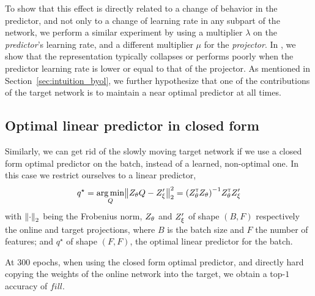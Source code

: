 
To show that this effect is directly related to a change of behavior in the predictor, and not only to a change of learning rate in any subpart of the network, we perform a similar experiment by using a multiplier $\lambda$ on the \emph{predictor}'s learning rate, and a different multiplier $\mu$ for the \emph{projector}.
In , we show  that the representation typically collapses or performs poorly when the predictor learning rate is lower or equal to that of the projector. As mentioned in Section~\ref{sec:intuition_byol}, we further hypothesize that one of the contributions of the target network is to maintain a near optimal predictor at all times.

\subsection{Optimal linear predictor in closed form}
Similarly, we can get rid of the slowly moving target network if we use a closed form optimal predictor on the batch, instead of a learned, non-optimal one. In this case we restrict ourselves to a linear predictor,
\begin{align*}
    q^\star = \argmin_{Q} \normtwo{Z_\netparams Q - Z'_\targetparams}^2= \pa{Z_\netparams\transpose Z_\netparams}^{-1} Z_\netparams\transpose Z'_\targetparams
\end{align*}
with $\normtwo{\cdot}$ being the Frobenius norm, $Z_{\theta}$ and $Z'_\xi$ of shape $(B, F)$ respectively the online and target projections, where $B$ is the batch size and $F$ the number of features; and $q^\star$ of shape $(F, F)$, the optimal linear predictor for the batch. 

At $300$ epochs, when using the closed form optimal predictor, and directly hard copying the weights of the online network into the target, we obtain a top-$1$ accuracy of $fill$.


